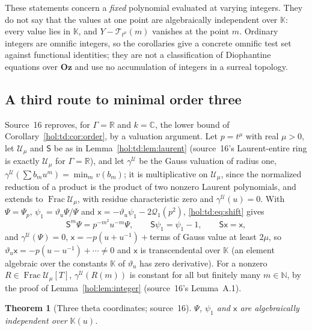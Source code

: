 \documentclass[11pt]{article}
\numberwithin{equation}{section}
\newtheorem{theorem}{Theorem}[section]
\theoremstyle{definition}
\theoremstyle{remark}
\newcommand{\C}{\mathbb C}
\newcommand{\R}{\mathbb R}
\newcommand{\N}{\mathbb N}
\newcommand{\KK}{\mathbb K}
\newcommand{\Oz}{\mathbf{Oz}}
\begin{document}
These statements concern a \emph{fixed} polynomial evaluated at varying
integers. They do not say that the values at one point are algebraically
independent over $\KK$: every value lies in $\KK$, and $Y-\mathcal T_{t^\mu}(m)$
vanishes at the point $m$. Ordinary integers are omnific integers, so the
corollaries give a concrete omnific test set against functional identities;
they are not a classification of Diophantine equations over $\Oz$ and use no
accumulation of integers in a surreal topology.

\subsection{A third route to minimal order three}\label{hol:th:sub:third}

Source~16 reproves, for $\Gamma=\R$ and $k=\C$, the lower bound of
Corollary~\ref{hol:td:cor:order}, by a valuation argument. Let $p=t^\mu$ with
real $\mu>0$, let $\mathcal U_\mu$ and $\mathsf S$ be as in
Lemma~\ref{hol:td:lem:laurent} (source~16's Laurent-entire ring is exactly
$\mathcal U_\mu$ for $\Gamma=\R$), and let $\gamma^{\mathcal U}$ be the Gauss
valuation of radius one, $\gamma^{\mathcal U}(\sum b_mu^m)=\min_mv(b_m)$; it is
multiplicative on $\mathcal U_\mu$, since the normalized reduction of a product
is the product of two nonzero Laurent polynomials, and extends to
$\operatorname{Frac}\mathcal U_\mu$, with residue characteristic zero and
$\gamma^{\mathcal U}(u)=0$. With $\Psi=\Psi_p$, $\psi_1=\vartheta_u\Psi/\Psi$ and
$\mathsf x=-\vartheta_u\psi_1-2\mathcal Q_1(p^2)$, \eqref{hol:td:eq:shift} gives
\[
 \mathsf S^m\Psi=p^{-m^2}u^{-m}\Psi,\qquad \mathsf S\psi_1=\psi_1-1,\qquad
 \mathsf S\mathsf x=\mathsf x ,
\]
and $\gamma^{\mathcal U}(\Psi)=0$, $\mathsf x=-p(u+u^{-1})+{}$terms of Gauss
value at least $2\mu$, so $\vartheta_u\mathsf x=-p(u-u^{-1})+\cdots\ne0$ and
$\mathsf x$ is transcendental over $\KK$ (an element algebraic over the
constants $\KK$ of $\vartheta_u$ has zero derivative). For a nonzero
$R\in\operatorname{Frac}\mathcal U_\mu[T]$, $\gamma^{\mathcal U}(R(m))$ is
constant for all but finitely many $m\in\N$, by the proof of
Lemma~\ref{hol:lem:integer} (source~16's Lemma~A.1).

\begin{theorem}[Three theta coordinates; source~16]
\label{hol:th:thm:seedthree}
$\Psi$, $\psi_1$ and $\mathsf x$ are algebraically independent over $\KK(u)$.
\end{theorem}
\end{document}

